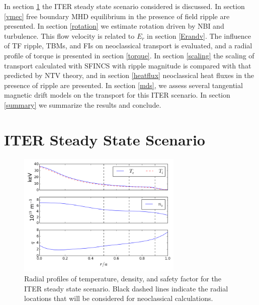\documentclass[aip, pop, preprint]{revtex4-1}
\numberwithin{figure}{section}
\numberwithin{equation}{section}
\begin{document}
In section \ref{steadystate} the ITER steady state scenario considered is discussed. In section \ref{vmec} free boundary MHD equilibrium in the presence of field ripple are presented. In section \ref{rotation} we estimate rotation driven by NBI and turbulence. This flow velocity is related to $E_r$ in section \ref{Erandv}. The influence of TF ripple, TBMs, and FIs on neoclassical transport is evaluated, and a radial profile of torque is presented in section \ref{torque}. In section \ref{scaling} the scaling of transport calculated with SFINCS with ripple magnitude is compared with that predicted by NTV theory, and in section \ref{heatflux} neoclassical heat fluxes in the presence of ripple are presented. In section \ref{mds}, we assess several tangential magnetic drift models on the transport for this ITER scenario. In section \ref{summary} we summarize the results and conclude.

\section{ITER Steady State Scenario}\label{steadystate}

\FloatBarrier

\begin{figure}[h!]
\centering
\includegraphics[width=0.7\textwidth]{profiles.png}
\caption{\label{fig:profiles} Radial profiles of temperature, density, and safety factor for the ITER steady state scenario.\cite{Poli2014} Black dashed lines indicate the radial locations that will be considered for neoclassical calculations.}
\end{figure}
\end{document}
